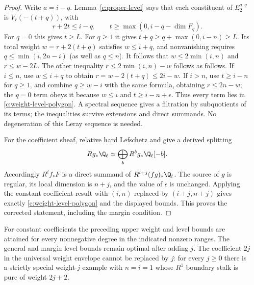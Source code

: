 \begin{proof}
Write $a=i-q$. Lemma~\ref{c:proper-level} says that each constituent of $E_2^{a,q}$ is $V_r(-(t+q))$, with
\[
 r+2t\leq i-q,
 \qquad t\geq\max(0,i-q-\dim F_q).
\]
For $q=0$ this gives $t\geq L$. For $q\geq1$ it gives $t+q\geq q+\max(0,i-n)\geq L$. Its total weight $w=r+2(t+q)$ satisfies $w\leq i+q$, and nonvanishing requires $q\leq\min(i,2n-i)$ (as well as $q\leq n$). It follows that $w\leq2\min(i,n)$ and $r\leq w-2L$. The other inequality $r\leq2\min(i,n)-w$ follows as follows. If $i\leq n$, use $w\leq i+q$ to obtain $r=w-2(t+q)\leq2i-w$. If $i>n$, use $t\geq i-n$ for $q\geq1$, and combine $q\geq w-i$ with the same formula, obtaining $r\leq2n-w$; the $q=0$ term obeys it because $w\leq i$ and $t\geq i-n+\epsilon$. Thus every term lies in \eqref{c:weight-level-polygon}. A spectral sequence gives a filtration by subquotients of its terms; the inequalities survive extensions and direct summands. No degeneration of this Leray sequence is needed.

For the coefficient sheaf, relative hard Lefschetz and \citet[Theorem 1.5 and Proposition 2.4]{c_deligne1968} give a derived splitting
\[
 Rg_*\Q_\ell\simeq\bigoplus_bR^bg_*\Q_\ell[-b].
\]
Accordingly $R^if_*F$ is a direct summand of $R^{i+j}(fg)_*\Q_\ell$. The source of $g$ is regular, its local dimension is $n+j$, and the value of $\epsilon$ is unchanged. Applying the constant-coefficient result with $(i,n)$ replaced by $(i+j,n+j)$ gives exactly \eqref{c:weight-level-polygon} and the displayed bounds. This proves the corrected statement, including the margin condition.
\end{proof}

\begin{proposition}
\label{c:level-optimality}
For constant coefficients the preceding upper weight and level bounds are attained for every nonnegative degree in the indicated nonzero ranges. The general and margin level bounds remain optimal after adding $j$. The coefficient $2j$ in the universal weight envelope cannot be replaced by $j$: for every $j\geq0$ there is a strictly special weight-$j$ example with $n=i=1$ whose $R^1$ boundary stalk is pure of weight $2j+2$.
\end{proposition}

